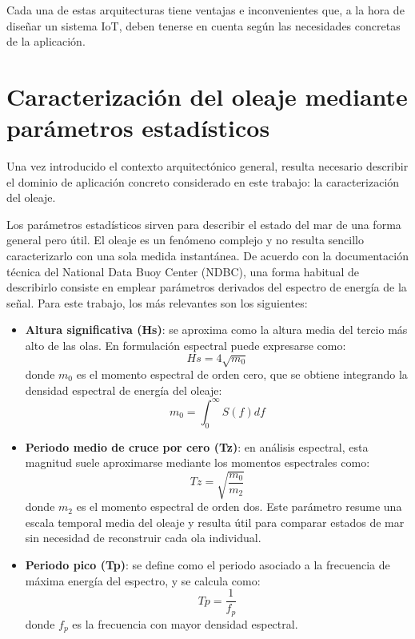 Cada una de estas arquitecturas tiene ventajas e inconvenientes que, a la hora de diseñar un sistema IoT, deben tenerse en cuenta según las necesidades concretas de la aplicación.



\section{Caracterización del oleaje mediante parámetros estadísticos}

Una vez introducido el contexto arquitectónico general, resulta necesario describir el dominio de aplicación concreto considerado en este trabajo: la caracterización del oleaje.

Los parámetros estadísticos sirven para describir el estado del mar de una forma general pero útil. El oleaje es un fenómeno complejo y no resulta sencillo caracterizarlo con una sola medida instantánea. De acuerdo con la documentación técnica del National Data Buoy Center (NDBC), una forma habitual de describirlo consiste en emplear parámetros derivados del espectro de energía de la señal. Para este trabajo, los más relevantes son los siguientes:

\begin{itemize}
  \item \textbf{Altura significativa (Hs)}: se aproxima como la altura media del tercio más alto de las olas. En formulación espectral puede expresarse como:
$$ Hs = 4 \sqrt{m_0} $$
donde $m_0$ es el momento espectral de orden cero, que se obtiene integrando la densidad espectral de energía del oleaje:
$$ m_0 = \int_0^\infty S(f) df $$
  \item \textbf{Periodo medio de cruce por cero (Tz)}: en análisis espectral, esta magnitud suele aproximarse mediante los momentos espectrales como:
$$ Tz = \sqrt{\frac{m_0}{m_2}} $$
donde $m_2$ es el momento espectral de orden dos. Este parámetro resume una escala temporal media del oleaje y resulta útil para comparar estados de mar sin necesidad de reconstruir cada ola individual.
  \item \textbf{Periodo pico (Tp)}: se define como el periodo asociado a la frecuencia de máxima energía del espectro, y se calcula como:
$$ Tp = \frac{1}{f_p} $$
donde $f_p$ es la frecuencia con mayor densidad espectral.
\end{itemize} 

